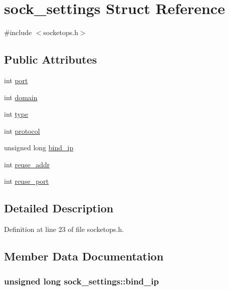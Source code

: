\hypertarget{structsock__settings}{\section{sock\-\_\-settings Struct Reference}
\label{structsock__settings}
}


{\ttfamily \#include $<$socketops.\-h$>$}

\subsection*{Public Attributes}
\begin{DoxyCompactItemize}
\item 
int \hyperlink{structsock__settings_aef86a0ad1b9e93d1a5b5c0c27f9336f8}{port}
\item 
int \hyperlink{structsock__settings_a95727084b18e3c1923a219e15260d79b}{domain}
\item 
int \hyperlink{structsock__settings_afbd04165a11524a3a0ff83702958398f}{type}
\item 
int \hyperlink{structsock__settings_a938f8fc4b2ec0de16c809d4cc1d301da}{protocol}
\item 
unsigned long \hyperlink{structsock__settings_a894feefad3edf96c08f07b4497a8f1d0}{bind\-\_\-ip}
\item 
int \hyperlink{structsock__settings_a912e4c6ee79af4d8d259b7c85239a7f7}{reuse\-\_\-addr}
\item 
int \hyperlink{structsock__settings_a9c727193200daa5ef25f9a74e983de1f}{reuse\-\_\-port}
\end{DoxyCompactItemize}


\subsection{Detailed Description}


Definition at line 23 of file socketops.\-h.



\subsection{Member Data Documentation}
\hypertarget{structsock__settings_a894feefad3edf96c08f07b4497a8f1d0}{
\subsubsection[{bind\-\_\-ip}]{\setlength{\rightskip}{0pt plus 5cm}unsigned long sock\-\_\-settings\-::bind\-\_\-ip}}\label{structsock__settings_a894feefad3edf96c08f07b4497a8f1d0}


